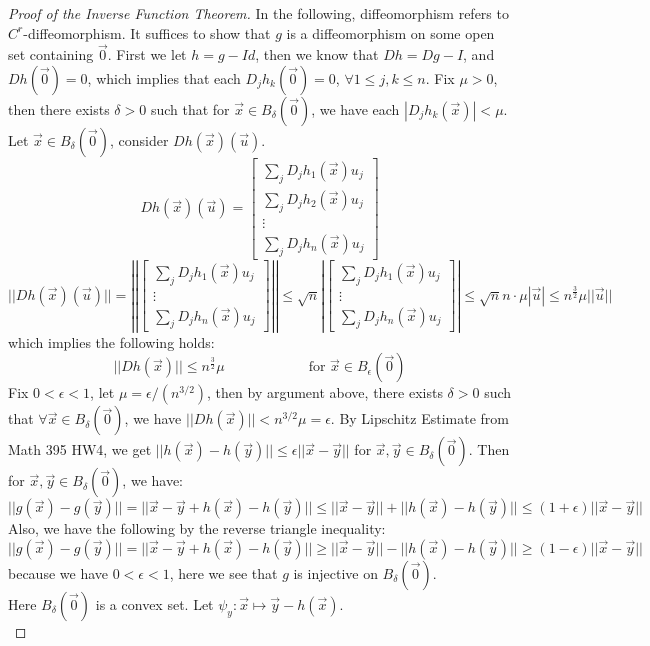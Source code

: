 \documentclass[15pt]{book}
\theoremstyle{break}
\theoremstyle{break}
\begin{document}
\begin{proof}[Proof of the Inverse Function Theorem]
In the following, diffeomorphism refers to $C^r$-diffeomorphism. It suffices to show that $g$ is a diffeomorphism on some open set containing $\vec{0}$. First we let $h = g-Id$, then we know that $Dh = Dg-I$, and $Dh(\vec{0}) = 0$, which implies that each $D_j h_k(\vec{0}) = 0$, $\forall 1\leq j,k \leq n$. Fix $\mu >0$, then there exists $\delta >0$ such that for $\vec{x}\in B_\delta(\vec{0})$, we have each $|D_jh_k(\vec{x})| < \mu$. Let $\vec{x} \in B_\delta(\vec{0})$, consider $Dh(\vec{x})(\vec{u})$. 
$$Dh(\vec{x})(\vec{u}) = \begin{bmatrix}
\sum_j D_jh_1(\vec{x})u_j\\\sum_j D_jh_2(\vec{x})u_j \\ \vdots \\ \sum_j D_j h_n (\vec{x})u_j
\end{bmatrix}$$
\medskip
$$||Dh(\vec{x})(\vec{u})||= \left|\left|\begin{bmatrix}
\sum_j D_jh_1(\vec{x})u_j \\ \vdots \\ \sum_j D_j h_n (\vec{x})u_j
\end{bmatrix}\right|\right|\leq \sqrt{n} \left|\begin{bmatrix}
\sum_j D_jh_1(\vec{x})u_j \\ \vdots \\ \sum_j D_j h_n (\vec{x})u_j
\end{bmatrix}\right| \leq \sqrt{n}n\cdot \mu |\vec{u}|\leq n^\frac{3}{2}\mu ||\vec{u}||$$
which implies the following holds:
$$||Dh(\vec{x})|| \leq n^{\frac{3}{2}} \mu \qquad\qquad\qquad\text{for }\vec{x} \in B_\epsilon(\vec{0})$$
Fix $0 <\epsilon <1$, let $\mu = \epsilon/(n^{3/2})$, then by argument above, there exists $\delta>0$ such that $\forall \vec{x}\in B_\delta(\vec{0})$, we have $||Dh(\vec{x})||<n^{3/2}\mu = \epsilon$. By Lipschitz Estimate from Math 395 HW4, we get $||h(\vec{x}) -h(\vec{y})|| \leq \epsilon ||\vec{x}-\vec{y}||$ for $\vec{x},\vec{y}\in B_\delta(\vec{0})$. Then for $\vec{x},\vec{y}\in B_\delta(\vec{0})$, we have: $$||g(\vec{x})-g(\vec{y})|| = ||\vec{x}-\vec{y} +h(\vec{x})-h(\vec{y})||\leq ||\vec{x}-\vec{y}|| + ||h(\vec{x}) - h(\vec{y})|| \leq (1+\epsilon) ||\vec{x}-\vec{y}||$$
Also, we have the following by the reverse triangle inequality:
$$||g(\vec{x})-g(\vec{y})|| = ||\vec{x}-\vec{y}+h(\vec{x})-h(\vec{y})|| \geq ||\vec{x}-\vec{y}|| - ||h(\vec{x})-h(\vec{y})|| \geq (1-\epsilon)||\vec{x}-\vec{y}||$$
because we have $0< \epsilon<1$, here we see that $g$ is injective on $B_\delta(\vec{0})$.\\ 
Here $B_\delta(\vec{0})$ is a convex set. Let $\psi_y : \vec{x}\mapsto \vec{y}-h(\vec{x})$.\\ 


\end{proof}
\end{document}
